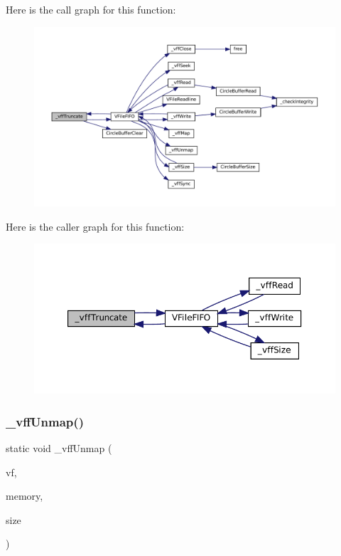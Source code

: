 Here is the call graph for this function\+:
\nopagebreak
\begin{figure}[H]
\begin{center}
\leavevmode
\includegraphics[width=350pt]{vfs-fifo_8c_a44e1cdacc71a8e16868d8c968e644ec6_cgraph}
\end{center}
\end{figure}
Here is the caller graph for this function\+:
\nopagebreak
\begin{figure}[H]
\begin{center}
\leavevmode
\includegraphics[width=350pt]{vfs-fifo_8c_a44e1cdacc71a8e16868d8c968e644ec6_icgraph}
\end{center}
\end{figure}
\mbox{\label{vfs-fifo_8c_a359856c1b2b58f1cb08c962ff0bbd6f7}} 
\subsubsection{\texorpdfstring{\+\_\+vff\+Unmap()}{\_vffUnmap()}}
{\footnotesize\ttfamily static void \+\_\+vff\+Unmap (\begin{DoxyParamCaption}\item[{struct V\+File $\ast$}]{vf,  }\item[{void $\ast$}]{memory,  }\item[{size\+\_\+t}]{size }\end{DoxyParamCaption})\hspace{0.3cm}{\ttfamily [static]}}

